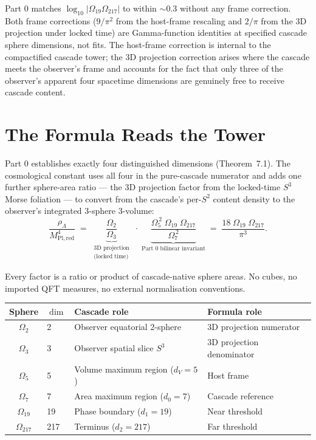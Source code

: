 \documentclass[11pt,a4paper]{article}
\begin{document}
Part 0 matches $\log_{10}|\Omega_{19}\Omega_{217}|$ to within $\sim 0.3$
without any frame correction. Both frame corrections ($9/\pi^2$ from
the host-frame rescaling and $2/\pi$ from the 3D projection under locked
time) are Gamma-function identities at specified cascade sphere
dimensions, not fits. The host-frame correction is internal to the
compactified cascade tower; the 3D projection correction arises where
the cascade meets the observer's frame and accounts for the fact that
only three of the observer's apparent four spacetime dimensions are
genuinely free to receive cascade content.

\section{The Formula Reads the Tower}\label{sec:the-formula-reads-the-tower}

Part 0 establishes exactly four distinguished dimensions (Theorem~7.1).
The cosmological constant uses all four in the pure-cascade numerator
and adds one further sphere-area ratio --- the 3D projection factor
from the locked-time $S^3$ Morse foliation --- to convert from the
cascade's per-$S^2$ content density to the observer's integrated
3-sphere 3-volume:
\[
\frac{\rho_\Lambda}{M^4_{\mathrm{Pl,red}}}
\;=\;
\underbrace{\frac{\Omega_2}{\Omega_3}}_{\substack{\text{3D projection}\\\text{(locked time)}}}
\;\cdot\;
\underbrace{\frac{\Omega_{5}^{\,2}\;\Omega_{19}\;\Omega_{217}}{\Omega_7^{\,2}}}_{\text{Part 0 bilinear invariant}}
\;=\;
\frac{18\;\Omega_{19}\;\Omega_{217}}{\pi^3}.
\]

Every factor is a ratio or product of cascade-native sphere areas. No
cubes, no imported QFT measures, no external normalisation conventions.

\begin{center}
\begin{tabular}{clll}
\toprule
Sphere & $\dim$ & Cascade role & Formula role \\
\midrule
$\Omega_2$ & 2 & Observer equatorial 2-sphere & 3D projection numerator \\
$\Omega_3$ & 3 & Observer spatial slice $S^3$ & 3D projection denominator \\
$\Omega_5$ & 5 & Volume maximum region ($d_V=5$) & Host frame \\
$\Omega_7$ & 7 & Area maximum region ($d_0=7$) & Cascade reference \\
$\Omega_{19}$ & 19 & Phase boundary ($d_1=19$) & Near threshold \\
$\Omega_{217}$ & 217 & Terminus ($d_2=217$) & Far threshold \\
\bottomrule
\end{tabular}
\end{center}
\end{document}
